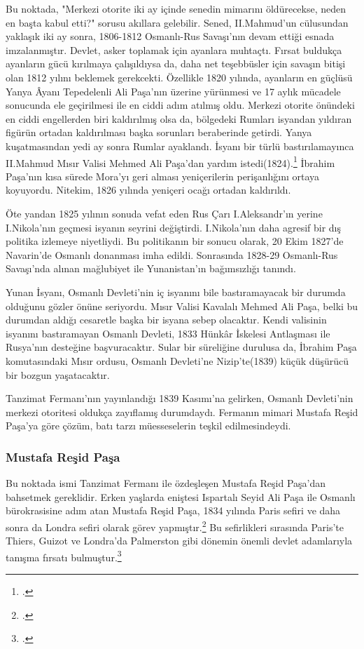 Bu noktada, "Merkezi otorite iki ay içinde senedin mimarını öldürecekse, neden en başta kabul etti?" sorusu akıllara gelebilir. Sened, II.Mahmud'un cülusundan yaklaşık iki ay sonra, 1806-1812 Osmanlı-Rus Savaşı'nın devam ettiği esnada imzalanmıştır. Devlet, asker toplamak için 
ayanlara muhtaçtı. Fırsat buldukça ayanların gücü kırılmaya çalışıldıysa da, daha net teşebbüsler için savaşın bitişi olan 1812 yılını beklemek gerekcekti. Özellikle 1820 yılında, ayanların en güçlüsü Yanya Âyanı Tepedelenli Ali Paşa'nın üzerine yürünmesi ve 17 aylık mücadele 
sonucunda ele geçirilmesi ile en ciddi adım atılmış oldu. Merkezi otorite önündeki en ciddi engellerden biri kaldırılmış olsa da, bölgedeki Rumları isyandan yıldıran figürün ortadan kaldırılması başka sorunları beraberinde getirdi. Yanya kuşatmasından yedi ay sonra 
Rumlar ayaklandı. İsyanı bir türlü bastırılamayınca II.Mahmud Mısır Valisi Mehmed Ali Paşa'dan yardım istedi(1824).\footcite[140]{tanzimat} İbrahim Paşa'nın kısa sürede Mora'yı geri alması yeniçerilerin perişanlığını ortaya koyuyordu. Nitekim, 1826 yılında yeniçeri ocağı ortadan 
kaldırıldı. 

Öte yandan 1825 yılının sonuda vefat eden Rus Çarı I.Aleksandr'ın yerine I.Nikola'nın geçmesi isyanın seyrini değiştirdi. I.Nikola'nın daha agresif bir dış 
politika izlemeye niyetliydi. Bu politikanın bir sonucu olarak, 20 Ekim 1827'de Navarin'de Osmanlı donanması imha edildi. Sonrasında 1828-29 Osmanlı-Rus Savaşı'nda alınan mağlubiyet ile Yunanistan'ın bağımsızlığı tanındı. 

Yunan İsyanı, Osmanlı Devleti'nin iç isyanını bile bastıramayacak bir durumda olduğunu gözler önüne seriyordu. Mısır Valisi Kavalalı Mehmed Ali Paşa, belki bu durumdan aldığı 
cesaretle başka bir isyana sebep olacaktır. Kendi valisinin isyanını bastıramayan Osmanlı Devleti, 1833 Hünkâr İskelesi Antlaşması ile Rusya'nın desteğine başvuracaktır. Sular bir süreliğine durulusa da,
İbrahim Paşa komutasındaki Mısır ordusu, Osmanlı Devleti'ne Nizip'te(1839) küçük düşürücü bir bozgun yaşatacaktır.

Tanzimat Fermanı'nın yayınlandığı 1839 Kasımı'na gelirken, Osmanlı Devleti'nin merkezi otoritesi oldukça zayıflamış durumdaydı. Fermanın mimari Mustafa Reşid Paşa'ya göre çözüm, batı tarzı müesseselerin teşkil edilmesindeydi.

\subsubsection{Mustafa Reşid Paşa}
\indent\indent Bu noktada ismi Tanzimat Fermanı ile özdeşleşen Mustafa Reşid Paşa'dan bahsetmek gereklidir. Erken yaşlarda eniştesi Ispartalı Seyid Ali Paşa ile Osmanlı bürokrasisine adım atan Mustafa Reşid Paşa,
1834 yılında Paris sefiri ve daha sonra da Londra sefiri olarak görev yapmıştır.\footcite[76]{tarih_musahabeleri} Bu sefirlikleri sırasında Paris'te Thiers, Guizot ve Londra'da Palmerston gibi dönemin önemli devlet adamlarıyla tanışma fırsatı bulmuştur.\footcite[124]{tanzimat}

